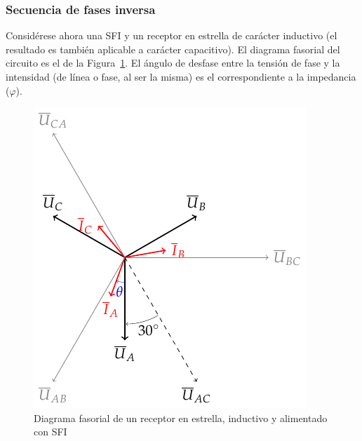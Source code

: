   \subsubsection{Secuencia de fases inversa}
	Considérese ahora una SFI y un receptor en estrella de carácter inductivo (el resultado es también aplicable a carácter capacitivo). El diagrama fasorial del circuito es el de la Figura~\ref{fig:fasores_potencia3H_SFI}. El ángulo de desfase entre la tensión de fase y la intensidad (de línea o fase, al ser la misma) es el correspondiente a la impedancia ($\varphi$).
	\begin{figure}[H]
	    \centering
	    \includegraphics{../figs/fasores_potencia3H_SFI.pdf}
	    \caption{Diagrama fasorial de un receptor en estrella, inductivo y alimentado con SFI}
	    \label{fig:fasores_potencia3H_SFI}
	\end{figure}
	
